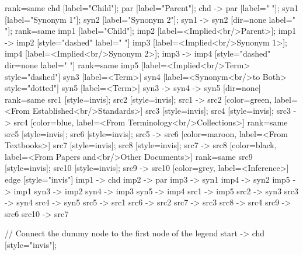 \documentclass{article}
\begin{document}
{{    {
        rank=same
        chd [label="Child"];
        par [label="Parent"];
        chd -> par [label="                "];
        syn1 [label="Synonym 1"];
        syn2 [label="Synonym 2"];
        syn1 -> syn2 [dir=none label="                "];
    }
    {
        rank=same
        imp1 [label="Child"];
        imp2 [label=<Implied<br/>Parent>];
        imp1 -> imp2 [style="dashed" label="                "]
        imp3 [label=<Implied<br/>Synonym 1>];
        imp4 [label=<Implied<br/>Synonym 2>];
        imp3 -> imp4 [style="dashed" dir=none label="                "]
    }
    {
        rank=same
        imp5 [label=<Implied<br/>Term> style="dashed"]
        syn3 [label=<Term>]
        syn4 [label=<Synonym<br/>to Both> style="dotted"]
        syn5 [label=<Term>]
        syn3 -> syn4 -> syn5 [dir=none]
    }
{
rank=same
src1 [style=invis];
src2 [style=invis];
src1 -> src2 [color=green, label=<From Established<br/>Standards>]
src3 [style=invis];
src4 [style=invis];
src3 -> src4 [color=blue, label=<From Terminology<br/>Collections>]
}
{
rank=same
src5 [style=invis];
src6 [style=invis];
src5 -> src6 [color=maroon, label=<From Textbooks>]
src7 [style=invis];
src8 [style=invis];
src7 -> src8 [color=black, label=<From Papers and<br/>Other Documents>]
}
{
rank=same
src9 [style=invis];
src10 [style=invis];
src9 -> src10 [color=grey, label=<Inference>]
}
edge [style="invis"]
imp1 -> chd
imp2 -> par
imp3 -> syn1
imp4 -> syn2
imp5 -> imp1
syn3 -> imp2
syn4 -> imp3
syn5 -> imp4
src1 -> imp5
src2 -> syn3
src3 -> syn4
src4 -> syn5
src5 -> src1
src6 -> src2
src7 -> src3
src8 -> src4
src9 -> src6
src10 -> src7
}

// Connect the dummy node to the first node of the legend
start -> chd [style="invis"];
}
\end{document}
